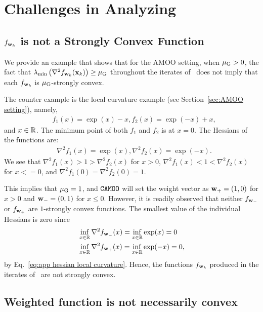 \section{Challenges in Analyzing~\CAMOO}


\subsection{$f_{{\mathbf{w}}_k}$ is not a Strongly Convex Function }\label{app:fwk is not strongly convex}

We provide an example that shows that for the AMOO setting, when ${\mu_{\mathrm{G}}}>0$, the fact that $\lambda_{\min}\left(\nabla^2 f_{{\mathbf{w}}_k}({\mathbf{x}}_k)\right)\geq {\mu_{\mathrm{G}}}$ throughout the iterates of \CAMOO\ does not imply that each $f_{{\mathbf{w}}_k}$ is ${\mu_{\mathrm{G}}}$-strongly convex.

The counter example is the local curvature example (see Section~\ref{sec:AMOO setting}), namely,
\begin{align*}
    &f_1(x) = \exp(x)-x, f_2(x) = \exp(-x)+x,
\end{align*}
and $x\in \mathbb{R}$. The minimum point of both $f_1$ and $f_2$ is at $x=0$. The Hessians of the functions are:
\begin{align}
    &\nabla^2 f_1(x) = \exp(x), \nabla^2 f_2(x) = \exp(-x). \label{eq:app hessian local curvature}
\end{align}
We see that $\nabla^2 f_1(x)>1> \nabla^2 f_2(x)$ for $x>0$, $\nabla^2 f_1(x)<1< \nabla^2 f_2(x)$ for $x<=0$, and $\nabla^2 f_1(0)= \nabla^2 f_2(0)=1$. 

This implies that ${\mu_{\mathrm{G}}} = 1$, and $\texttt{CAMOO}$ will set the weight vector as ${\mathbf{w}}_{+}=(1,0)$ for $x>0$ and ${\mathbf{w}}_{-}=(0,1)$ for $x\leq0$. However, it is readily observed that neither $f_{{\mathbf{w}}_{-}}$ or $f_{{\mathbf{w}}_{+}}$ are $1$-strongly convex functions. The smallest value of the individual Hessians is zero since
\begin{align*}
    &\inf_{x\in \mathbb{R}}\nabla^2 f_{{\mathbf{w}}_{-}}(x)= \inf_{x\in \mathbb{R}}\exp(x)=0\\
    & \inf_{x\in \mathbb{R}}\nabla^2 f_{{\mathbf{w}}_{+}}(x)= \inf_{x\in \mathbb{R}}\exp(-x)=0,
\end{align*}
by Eq.~\eqref{eq:app hessian local curvature}. Hence, the functions $f_{{\mathbf{w}}_k}$ produced in the iterates of \CAMOO\ are not strongly convex.

\subsection{Weighted function is not necessarily convex}\label{app:naive reduction failure}

